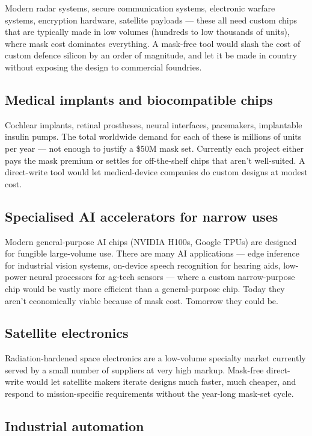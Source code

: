 \documentclass[11pt,letterpaper]{article}
\begin{document}
Modern radar systems, secure communication systems, electronic warfare systems, encryption hardware, satellite payloads --- these all need custom chips that are typically made in low volumes (hundreds to low thousands of units), where mask cost dominates everything. A mask-free tool would slash the cost of custom defence silicon by an order of magnitude, and let it be made in country without exposing the design to commercial foundries.

\subsection{Medical implants and biocompatible chips}

Cochlear implants, retinal prostheses, neural interfaces, pacemakers, implantable insulin pumps. The total worldwide demand for each of these is millions of units per year --- not enough to justify a \$50M mask set. Currently each project either pays the mask premium or settles for off-the-shelf chips that aren't well-suited. A direct-write tool would let medical-device companies do custom designs at modest cost.

\subsection{Specialised AI accelerators for narrow uses}

Modern general-purpose AI chips (NVIDIA H100s, Google TPUs) are designed for fungible large-volume use. There are many AI applications --- edge inference for industrial vision systems, on-device speech recognition for hearing aids, low-power neural processors for ag-tech sensors --- where a custom narrow-purpose chip would be vastly more efficient than a general-purpose chip. Today they aren't economically viable because of mask cost. Tomorrow they could be.

\subsection{Satellite electronics}

Radiation-hardened space electronics are a low-volume specialty market currently served by a small number of suppliers at very high markup. Mask-free direct-write would let satellite makers iterate designs much faster, much cheaper, and respond to mission-specific requirements without the year-long mask-set cycle.

\subsection{Industrial automation}
\end{document}
